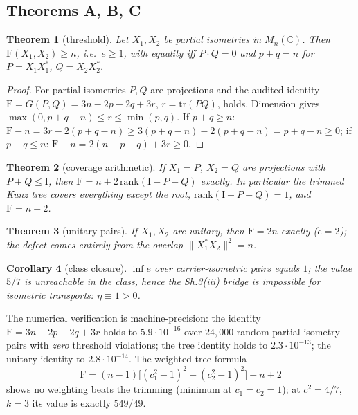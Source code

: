 \documentclass[11pt,a4paper]{article}
\newtheorem{theorem}{Theorem}
\newtheorem{corollary}[theorem]{Corollary}
\theoremstyle{definition}
\newcommand{\F}{\mathrm{F}}
\newcommand{\norm}[1]{\lVert #1\rVert}
\begin{document}
\subsection{Theorems A, B, C}

\begin{theorem}[threshold]\label{thm:A}
Let $X_1, X_2$ be partial isometries in $M_n(\mathbb{C})$. Then
$\F(X_1,X_2) \ge n$, i.e.\ $e \ge 1$, with equality iff $P\cdot Q = 0$
and $p + q = n$ for $P = X_1X_1^*$, $Q = X_2X_2^*$.
\end{theorem}

\begin{proof}
For partial isometries $P, Q$ are projections and the audited identity
$\F = G(P,Q) = 3n - 2p - 2q + 3r$, $r = \mathrm{tr}(PQ)$, holds.
Dimension gives $\max(0, p+q-n) \le r \le \min(p,q)$. If $p+q \ge n$:
$\F - n = 3r - 2(p+q-n) \ge 3(p+q-n) - 2(p+q-n) = p+q-n \ge 0$; if
$p+q \le n$: $\F - n = 2(n-p-q) + 3r \ge 0$.
\end{proof}

\begin{theorem}[coverage arithmetic]\label{thm:B}
If $X_1 = P$, $X_2 = Q$ are projections with $P + Q \le \mathrm{I}$,
then $\F = n + 2\,\mathrm{rank}(\mathrm{I} - P - Q)$ exactly. In
particular the trimmed Kunz tree covers everything except the root,
$\mathrm{rank}(\mathrm{I}-P-Q) = 1$, and $\F = n + 2$.
\end{theorem}

\begin{theorem}[unitary pairs]\label{thm:C}
If $X_1, X_2$ are unitary, then $\F = 2n$ exactly ($e = 2$); the defect
comes entirely from the overlap $\norm{X_1^*X_2}^2 = n$.
\end{theorem}

\begin{corollary}[class closure]\label{cor:D}
$\inf e$ over carrier-isometric pairs equals $1$; the value $5/7$ is
unreachable in the class, hence the Sh.3(iii) bridge is impossible for
isometric transports: $\eta \equiv 1 > 0$.
\end{corollary}

The numerical verification is machine-precision: the identity
$\F = 3n - 2p - 2q + 3r$ holds to $5.9\cdot 10^{-16}$ over $24{,}000$
random partial-isometry pairs with \emph{zero} threshold violations;
the tree identity holds to $2.3\cdot 10^{-13}$; the unitary identity to
$2.8\cdot 10^{-14}$. The weighted-tree formula
\[
\F = (n-1)\big[(c_1^2-1)^2 + (c_2^2-1)^2\big] + n + 2
\]
shows no weighting beats the trimming (minimum at $c_1 = c_2 = 1$); at
$c^2 = 4/7$, $k = 3$ its value is exactly $549/49$.
\end{document}
